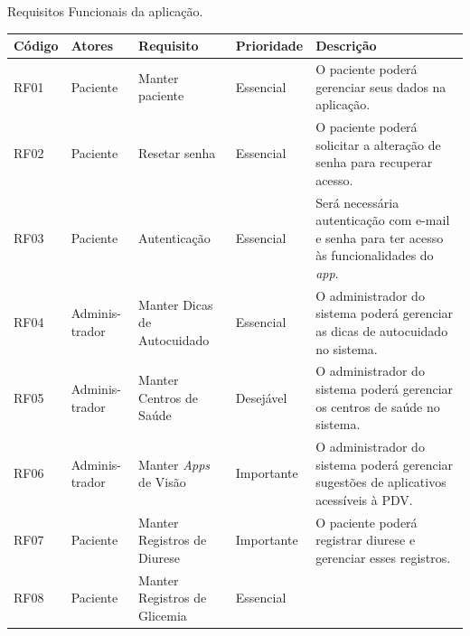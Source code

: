 \begin{quadro}[htb]
    \begin{center}
        \ABNTEXfontereduzida
        \caption{Requisitos Funcionais da aplicação.}
        \label{qua-req-fun}
        \begin{tabular}{p{1.1cm}|p{1.3cm}|p{3.0cm}|p{1.5cm}|p{6.7cm}}
            \textbf{Código} & \textbf{Atores} & \textbf{Requisito}              & \textbf{Prioridade} & \textbf{Descrição} \\
            \hline
            RF01            & Paciente        & Manter paciente                 & Essencial           &
            O paciente poderá gerenciar seus dados na aplicação.                                                           \\
            \hline
            RF02            & Paciente        & Resetar senha                   & Essencial           &
            O paciente poderá solicitar a alteração de senha para recuperar acesso.                                        \\
            \hline
            RF03            & Paciente        & Autenticação                    & Essencial           &
            Será necessária autenticação com e-mail e senha para ter acesso às funcionalidades do \emph{app}.              \\
            \hline
            RF04            & Adminis-trador  & Manter Dicas de Autocuidado     & Essencial           &
            O administrador do sistema poderá gerenciar as dicas de autocuidado no sistema.                                \\
            \hline
            RF05            & Adminis-trador  & Manter Centros de Saúde         & Desejável           &
            O administrador do sistema poderá gerenciar os centros de saúde no sistema.                                    \\
            \hline
            RF06            & Adminis-trador  & Manter \emph{Apps} de Visão     & Importante          &
            O administrador do sistema poderá gerenciar sugestões de aplicativos acessíveis à PDV\@.                       \\
            \hline
            RF07            & Paciente        & Manter Registros de Diurese     & Importante          &
            O paciente poderá registrar diurese e gerenciar esses registros.                                               \\
            \hline
            RF08            & Paciente        & Manter Registros de Glicemia    & Essencial           &

\end{tabular}
\end{center}
\end{quadro}

